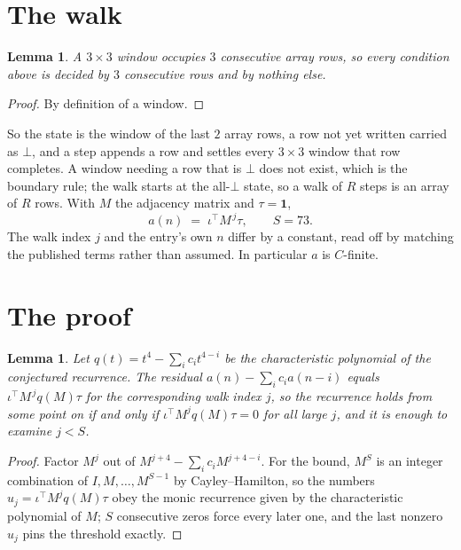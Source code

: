 \documentclass[11pt,a4paper]{article}
\theoremstyle{plain}
\newtheorem{lemma}[theorem]{Lemma}
\theoremstyle{definition}
\begin{document}
\section{The walk}

\begin{lemma}\label{lem:win}
A $3\times3$ window occupies $3$ consecutive array rows, so every condition above is
decided by $3$ consecutive rows and by nothing else.
\end{lemma}

\begin{proof}
By definition of a window.
\end{proof}

So the state is the window of the last $2$ array rows, a row not yet written carried as
$\bot$, and a step appends a row and settles every $3\times3$ window that row completes. A
window needing a row that is $\bot$ does not exist, which is the boundary rule; the walk starts
at the all-$\bot$ state, so a walk of $R$ steps is an array of $R$ rows. With $M$ the adjacency
matrix and $\tau=\mathbf{1}$,
\[
a(n)\;=\;\iota^{\!\top}M^{\,j}\tau ,\qquad S=73.
\]
The walk index $j$ and the entry's own $n$ differ by a constant, read off by matching the
published terms rather than assumed. In particular $a$ is $C$-finite.

\section{The proof}

\begin{lemma}\label{lem:crit}
Let $q(t)=t^{4}-\sum_i c_it^{4-i}$ be the characteristic polynomial of the
conjectured recurrence. The residual $a(n)-\sum_ic_ia(n-i)$ equals
$\iota^{\!\top}M^{\,j}q(M)\tau$ for the corresponding walk index $j$, so the recurrence
holds from some point on if and only if $\iota^{\!\top}M^{j}q(M)\tau=0$ for all large $j$,
and it is enough to examine $j<S$.
\end{lemma}

\begin{proof}
Factor $M^{j}$ out of $M^{j+4}-\sum_ic_iM^{j+4-i}$. For the bound, $M^{S}$
is an integer combination of $I,M,\dots,M^{S-1}$ by Cayley--Hamilton, so the numbers
$u_j=\iota^{\!\top}M^{j}q(M)\tau$ obey the monic recurrence given by the characteristic
polynomial of $M$; $S$ consecutive zeros force every later one, and the last nonzero $u_j$
pins the threshold exactly.
\end{proof}
\end{document}
